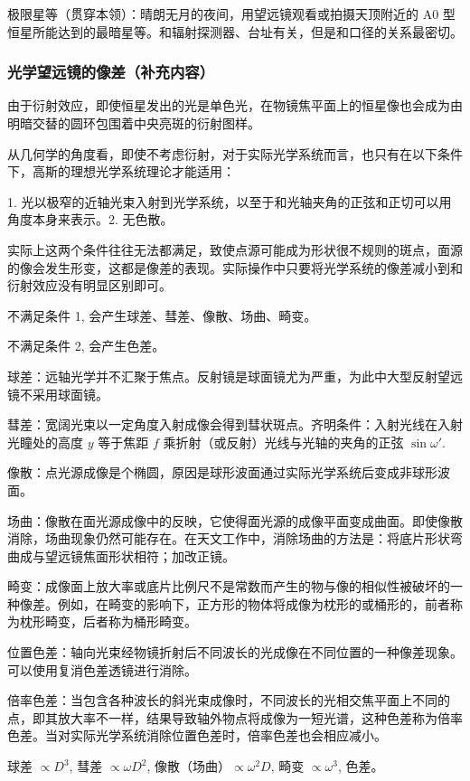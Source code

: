 \documentclass[UTF8, 12pt, a4paper, oneside, onecolumn, fontset=none]{ctexart}
\begin{document}
极限星等（贯穿本领）：晴朗无月的夜间，用望远镜观看或拍摄天顶附近的 A$0$ 型恒星所能达到的最暗星等。和辐射探测器、台址有关，但是和口径的关系最密切。

\subsubsection{光学望远镜的像差（补充内容）}
由于衍射效应，即使恒星发出的光是单色光，在物镜焦平面上的恒星像也会成为由明暗交替的圆环包围着中央亮斑的衍射图样。

从几何学的角度看，即使不考虑衍射，对于实际光学系统而言，也只有在以下条件下，高斯的理想光学系统理论才能适用：

1. 光以极窄的近轴光束入射到光学系统，以至于和光轴夹角的正弦和正切可以用角度本身来表示。2. 无色散。

实际上这两个条件往往无法都满足，致使点源可能成为形状很不规则的斑点，面源的像会发生形变，这都是像差的表现。实际操作中只要将光学系统的像差减小到和衍射效应没有明显区别即可。

不满足条件 1, 会产生球差、彗差、像散、场曲、畸变。

不满足条件 2, 会产生色差。

球差：远轴光学并不汇聚于焦点。反射镜是球面镜尤为严重，为此中大型反射望远镜不采用球面镜。

彗差：宽阔光束以一定角度入射成像会得到彗状斑点。齐明条件：入射光线在入射光瞳处的高度 $y$ 等于焦距 $f$ 乘折射（或反射）光线与光轴的夹角的正弦 $\sin{\omega'}$.

像散：点光源成像是个椭圆，原因是球形波面通过实际光学系统后变成非球形波面。

场曲：像散在面光源成像中的反映，它使得面光源的成像平面变成曲面。即使像散消除，场曲现象仍然可能存在。在天文工作中，消除场曲的方法是：将底片形状弯曲成与望远镜焦面形状相符；加改正镜。

畸变：成像面上放大率或底片比例尺不是常数而产生的物与像的相似性被破坏的一种像差。例如，在畸变的影响下，正方形的物体将成像为枕形的或桶形的，前者称为枕形畸变，后者称为桶形畸变。

位置色差：轴向光束经物镜折射后不同波长的光成像在不同位置的一种像差现象。可以使用复消色差透镜进行消除。

倍率色差：当包含各种波长的斜光束成像时，不同波长的光相交焦平面上不同的点，即其放大率不一样，结果导致轴外物点将成像为一短光谱，这种色差称为倍率色差。当对实际光学系统消除位置色差时，倍率色差也会相应减小。

球差 $\propto{}D^{3}$, 彗差 $\propto{}\omega D^{2}$, 像散（场曲）$\propto{}\omega^{2}D$, 畸变 $\propto{}\omega^{3}$, 色差。
\end{document}
